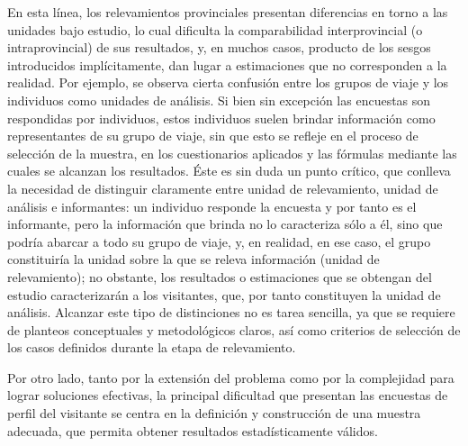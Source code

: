 \documentclass[
]{book}
\begin{document}
En esta línea, los relevamientos provinciales presentan diferencias en torno a las unidades bajo estudio, lo cual dificulta la comparabilidad interprovincial (o intraprovincial) de sus resultados, y, en muchos casos, producto de los sesgos introducidos implícitamente, dan lugar a estimaciones que no corresponden a la realidad. Por ejemplo, se observa cierta confusión entre los grupos de viaje y los individuos como unidades de análisis. Si bien sin excepción las encuestas son respondidas por individuos, estos individuos suelen brindar información como representantes de su grupo de viaje, sin que esto se refleje en el proceso de selección de la muestra, en los cuestionarios aplicados y las fórmulas mediante las cuales se alcanzan los resultados. Éste es sin duda un punto crítico, que conlleva la necesidad de distinguir claramente entre unidad de relevamiento, unidad de análisis e informantes: un individuo responde la encuesta y por tanto es el informante, pero la información que brinda no lo caracteriza sólo a él, sino que podría abarcar a todo su grupo de viaje, y, en realidad, en ese caso, el grupo constituiría la unidad sobre la que se releva información (unidad de relevamiento); no obstante, los resultados o estimaciones que se obtengan del estudio caracterizarán a los visitantes, que, por tanto constituyen la unidad de análisis. Alcanzar este tipo de distinciones no es tarea sencilla, ya que se requiere de planteos conceptuales y metodológicos claros, así como criterios de selección de los casos definidos durante la etapa de relevamiento.

Por otro lado, tanto por la extensión del problema como por la complejidad para lograr soluciones efectivas, la principal dificultad que presentan las encuestas de perfil del visitante se centra en la definición y construcción de una muestra adecuada, que permita obtener resultados estadísticamente válidos.
\end{document}
